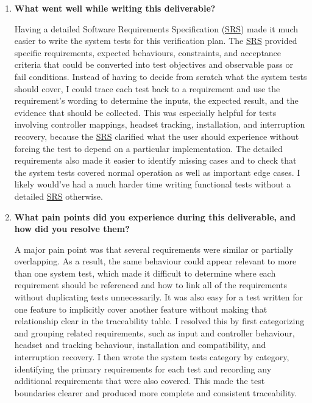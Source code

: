 \documentclass[12pt, titlepage]{article}
\begin{document}
\begin{enumerate}
    \item \textbf{What went well while writing this deliverable?}

    Having a detailed Software Requirements Specification (\hyperlink{abbr:SRS}{SRS}) made it much easier to write the system tests for this verification plan. The \hyperlink{abbr:SRS}{SRS} provided specific requirements, expected behaviours, constraints, and acceptance criteria that could be converted into test objectives and observable pass or fail conditions. Instead of having to decide from scratch what the system tests should cover, I could trace each test back to a requirement and use the requirement's wording to determine the inputs, the expected result, and the evidence that should be collected. This was especially helpful for tests involving controller mappings, headset tracking, installation, and interruption recovery, because the \hyperlink{abbr:SRS}{SRS} clarified what the user should experience without forcing the test to depend on a particular implementation. The detailed requirements also made it easier to identify missing cases and to check that the system tests covered normal operation as well as important edge cases. I likely would've had a much harder time writing functional tests without a detailed \hyperlink{abbr:SRS}{SRS} otherwise.

    \item \textbf{What pain points did you experience during this deliverable, and how did you resolve them?}

    A major pain point was that several requirements were similar or partially overlapping. As a result, the same behaviour could appear relevant to more than one system test, which made it difficult to determine where each requirement should be referenced and how to link all of the requirements without duplicating tests unnecessarily. It was also easy for a test written for one feature to implicitly cover another feature without making that relationship clear in the traceability table. I resolved this by first categorizing and grouping related requirements, such as input and controller behaviour, headset and tracking behaviour, installation and compatibility, and interruption recovery. I then wrote the system tests category by category, identifying the primary requirements for each test and recording any additional requirements that were also covered. This made the test boundaries clearer and produced more complete and consistent traceability.


\end{enumerate}
\end{document}
